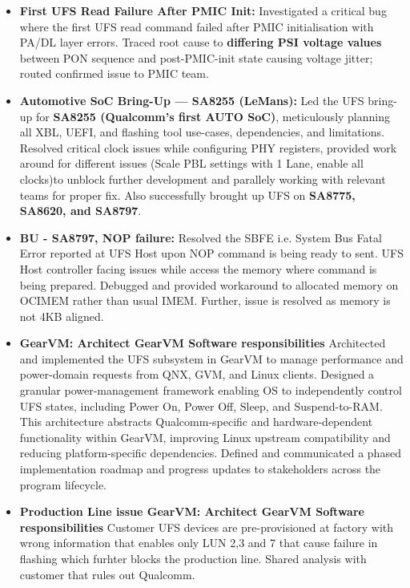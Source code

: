 \documentclass[10pt, a4paper]{article}
\begin{document}
\begin{itemize}
  \item \textbf{First UFS Read Failure After PMIC Init:}
        Investigated a critical bug where the first UFS read command failed
        after PMIC initialisation with PA/DL layer errors. Traced root cause to
        \textbf{differing PSI voltage values} between PON sequence and
        post-PMIC-init state causing voltage jitter; routed confirmed issue to
        PMIC team.

  \item \textbf{Automotive SoC Bring-Up --- SA8255 (LeMans):}
        Led the UFS bring-up for \textbf{SA8255 (Qualcomm's first AUTO SoC)},
        meticulously planning all XBL, UEFI, and flashing tool use-cases,
        dependencies, and limitations. Resolved critical clock issues while
		configuring PHY registers, provided work around for different issues
		(Scale PBL settings with 1 Lane, enable all clocks)to unblock further
		development and parallely working with relevant teams for proper fix.
		Also successfully brought up UFS on \textbf{SA8775, SA8620, and SA8797}.

  \item \textbf{BU - SA8797, NOP failure:}
        Resolved the SBFE i.e. System Bus Fatal Error reported at UFS Host upon NOP command
		is being ready to sent. UFS Host controller facing issues while access the memory
		where command is being prepared. Debugged and provided workaround to allocated memory
		on OCIMEM rather than usual IMEM. Further, issue is resolved as memory is not 4KB aligned.

  \item \textbf{GearVM: Architect GearVM Software responsibilities}
		Architected and implemented the UFS subsystem in GearVM to manage performance
		and power-domain requests from QNX, GVM, and Linux clients. Designed a granular
		power-management framework enabling OS to independently control	UFS states,
		including Power On, Power Off, Sleep, and Suspend-to-RAM. This architecture
		abstracts Qualcomm-specific and hardware-dependent functionality within 
		GearVM, improving Linux upstream compatibility and reducing platform-specific dependencies.
		Defined and communicated a phased implementation roadmap and progress 
		updates to stakeholders across the program lifecycle.

  \item \textbf{Production Line issue GearVM: Architect GearVM Software responsibilities}
		Customer UFS devices are pre-provisioned at factory with wrong information that enables
		only LUN 2,3 and 7 that cause failure in flashing which furhter blocks the production line.
		Shared analysis with customer that rules out Qualcomm.


\end{itemize}
\end{document}
